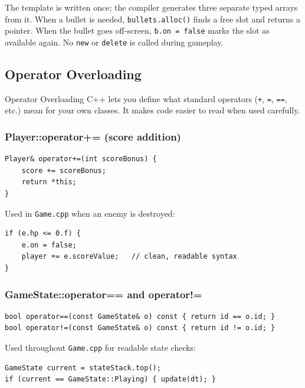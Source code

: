 \documentclass[11pt]{article}
\begin{document}
The template is written once; the compiler generates three separate typed
arrays from it. When a bullet is needed, \texttt{bullets.alloc()} finds a free
slot and returns a pointer. When the bullet goes off-screen,
\texttt{b.on = false} marks the slot as available again. No \texttt{new} or
\texttt{delete} is called during gameplay.

\subsection{Operator Overloading}

\begin{conceptbox}{Operator Overloading}
C++ lets you define what standard operators (\texttt{+}, \texttt{=},
\texttt{==}, etc.) mean for your own classes. It makes code easier to read
when used carefully.
\end{conceptbox}

\subsubsection{Player::operator+= (score addition)}

\begin{lstlisting}[caption={Score addition via operator overload (Player.h)}]
Player& operator+=(int scoreBonus) {
    score += scoreBonus;
    return *this;
}
\end{lstlisting}

Used in \texttt{Game.cpp} when an enemy is destroyed:
\begin{lstlisting}[caption={Using the overloaded operator in Game.cpp}]
if (e.hp <= 0.f) {
    e.on = false;
    player += e.scoreValue;   // clean, readable syntax
}
\end{lstlisting}

\subsubsection{GameState::operator== and operator!=}

\begin{lstlisting}[caption={Comparison operators on GameState (GameState.h)}]
bool operator==(const GameState& o) const { return id == o.id; }
bool operator!=(const GameState& o) const { return id != o.id; }
\end{lstlisting}

Used throughout \texttt{Game.cpp} for readable state checks:
\begin{lstlisting}[caption={State comparison in Game.cpp}]
GameState current = stateStack.top();
if (current == GameState::Playing) { update(dt); }
\end{lstlisting}
\end{document}

